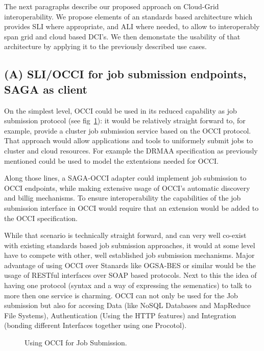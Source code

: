 \documentclass[10pt,conference,final,letterpaper,twoside,twocolumn,]{IEEEtran}
\begin{document}
The next paragraphs describe our proposed approach on Cloud-Grid
interoperability. We propose elements of an standards based
architecture which provides SLI where appropriate, and ALI where
needed, to allow to interoperably span grid and cloud based DCI's.  We
then demonstate the usability of that architecture by applying it to
the previously described use cases.

\subsection{(A) SLI/OCCI for job submission endpoints, SAGA as client}

On the simplest level, OCCI could be used in its reduced capability as
job submission protocol (see fig~\ref{fig:arch1}): it would be
relatively straight forward to, for example, provide a cluster job
submission service based on the OCCI protocol. That approach would
allow applications and tools to uniformely submit jobs to cluster and
cloud resources. For example the DRMAA specification as previously
mentioned could be used to model the extentsions needed for OCCI.

Along those lines, a SAGA-OCCI adapter could implement job submission
to OCCI endpoints, while making extensive usage of OCCI's automatic
discovery and billig mechanisms. To ensure interoperability the
capabilities of the job submission interface in OCCI would require
that an extension would be added to the OCCI specification.

While that scenario is technically straight forward, and can very well
co-exist with existing standards based job submission approaches, it
would at some level have to compete with other, well established job
submission mechanisms. Major advantage of using OCCI over Stanards
like OGSA-BES or similar would be the usage of RESTful interfaces over
SOAP based protocols. Next to this the idea of having one protocol
(syntax and a way of expressing the semenatics) to talk to more then
one service is charming. OCCI can not only be used for the Job
submission but also for accesing Data (like NoSQL Databases and
MapReduce File Systems), Authentication (Using the HTTP features) and
Integration (bonding different Interfaces together using one
Procotol).

\begin{figure}[htb]
 \caption{\label{fig:arch1} Using OCCI for Job Submission.}
\end{figure}
\end{document}
